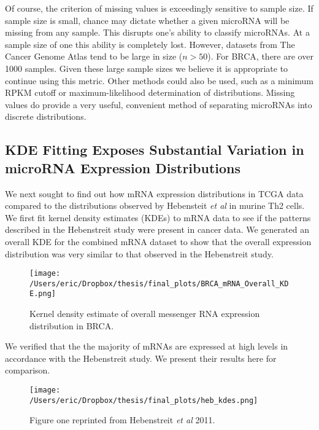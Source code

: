 \documentclass[12pt]{report}
\begin{document}
  Of course, the criterion of missing values is exceedingly sensitive to sample size. If sample size is small, chance may dictate whether a given microRNA will be missing from any sample. This disrupts one's ability
  to classify microRNAs. At a sample size of one this ability is completely lost. However, datasets from The Cancer Genome Atlas tend to be large in size ($n > 50$). For BRCA, there are over 1000 samples. Given these
  large sample sizes we believe it is appropriate to continue using this metric. Other methods could also be used, such as a minimum RPKM cutoff or maximum-likelihood determination of distributions. Missing values
  do provide a very useful, convenient method of separating microRNAs into discrete distributions. %
  


\subsection*{KDE Fitting Exposes Substantial Variation in microRNA Expression Distributions}
We next sought to find out how mRNA expression distributions in TCGA data compared to the distributions observed by Hebensteit \textit{et al} in murine Th2 cells. We first fit kernel density estimates (KDEs) to 
mRNA data to see if the patterns described in the Hebenstreit study were present in cancer data. We generated an overall KDE for the combined mRNA dataset to show
that the overall expression distribution was very similar to that observed in the Hebenstreit study.

\begin{figure}[H]
\centering
 \texttt{[image: /Users/eric/Dropbox/thesis/final\_plots/BRCA\_mRNA\_Overall\_KDE.png]}
 \caption{Kernel density estimate of overall messenger RNA expression distribution in BRCA.}
 \label{fig::brca_mrna_overall_kde}
\end{figure}

We verified that the the majority of mRNAs are expressed at high levels in accordance with the Hebenstreit study.  We present their results here for comparison.

\begin{figure}[H]
\centering
 \texttt{[image: /Users/eric/Dropbox/thesis/final\_plots/heb\_kdes.png]}
 \caption{Figure one reprinted from Hebenstreit \textit{et al } 2011.}
 \label{fig::brca_mrna_and_heb}
\end{figure}
\end{document}
